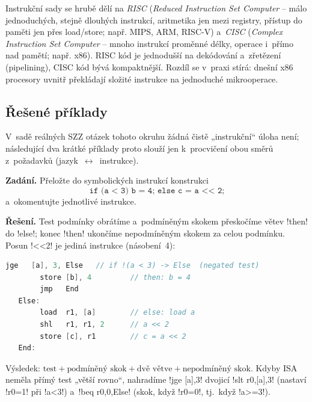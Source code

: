 \begin{poznamka}
Instrukční sady se hrubě dělí na \emph{RISC} (\emph{Reduced Instruction Set Computer} -- málo jednoduchých, stejně dlouhých instrukcí, aritmetika jen mezi registry, přístup do paměti jen přes load/store; např. MIPS, ARM, RISC-V) a~\emph{CISC} (\emph{Complex Instruction Set Computer} -- mnoho instrukcí proměnné délky, operace i~přímo nad pamětí; např. x86). RISC kód je jednodušší na dekódování a~zřetězení (pipelining), CISC kód bývá kompaktnější. Rozdíl se v~praxi stírá: dnešní x86 procesory uvnitř překládají složité instrukce na jednoduché mikrooperace.
\end{poznamka}

\subsection{Řešené příklady}

V~sadě reálných SZZ otázek tohoto okruhu žádná čistě „instrukční`` úloha není; následující dva krátké příklady proto slouží jen k~procvičení obou směrů z~požadavků (jazyk~$\leftrightarrow$~instrukce).

\begin{priklad}
\textbf{Zadání.} Přeložte do symbolických instrukcí konstrukci
\[
\texttt{if (a < 3) b = 4; else c = a << 2;}
\]
a~okomentujte jednotlivé instrukce.

\medskip
\textbf{Řešení.} Test podmínky obrátíme a~podmíněným skokem přeskočíme větev \cd!then! do \cd!else!; konec \cd!then! ukončíme nepodmíněným skokem za celou podmínku. Posun \cd!<<2! je jediná instrukce (násobení~4):
\begin{lstlisting}[language=C]
        jge   [a], 3, Else   // if !(a < 3) -> Else  (negated test)
        store [b], 4         // then: b = 4
        jmp   End
   Else:
        load  r1, [a]        // else: load a
        shl   r1, r1, 2      // a << 2
        store [c], r1        // c = a << 2
   End:
\end{lstlisting}
Výsledek: $\boxed{\text{test} + \text{podmíněný skok} + \text{dvě větve} + \text{nepodmíněný skok}}$. Kdyby ISA neměla přímý test „větší rovno``, nahradíme \cd!jge [a],3! dvojicí \cd!slt r0,[a],3! (nastaví \cd!r0=1! při \cd!a<3!) a~\cd!beq r0,0,Else! (skok, když \cd!r0=0!, tj.\ když \cd!a>=3!).
\end{priklad}


